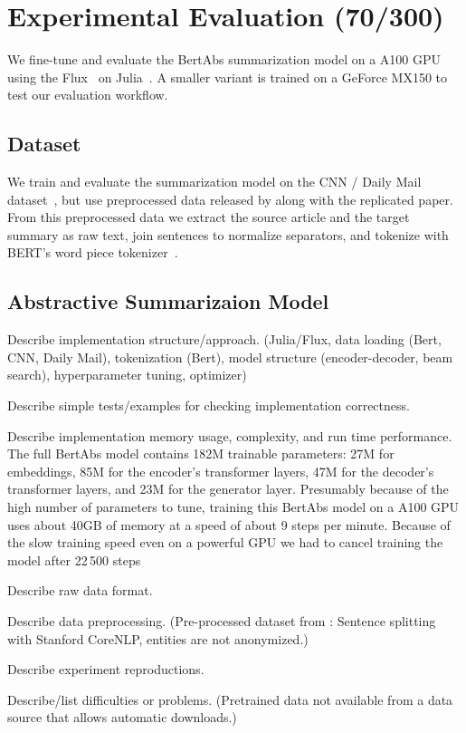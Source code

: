 \section{Experimental Evaluation (70/300)}

We fine-tune and evaluate the BertAbs summarization model on a A100 GPU using the Flux~\cite{InnesSFGRJKPS2018} on Julia~\cite{BezansonEKS2017}.
A smaller variant is trained on a GeForce MX150 to {\color{red} test our evaluation workflow}.

\subsection{Dataset}

We train and evaluate the summarization model on the CNN / Daily Mail dataset~\cite{HermannKGEKSB2015}, but use preprocessed data released by \citeauthor{LiuL2019} along with the replicated paper.
From this preprocessed data we extract the source article and the target summary as raw text, join sentences to normalize separators, and tokenize with BERT's word piece tokenizer~\cite{DevlinCLT2019}.

\subsection{Abstractive Summarizaion Model}


Describe implementation structure/approach. (Julia/Flux, data loading (Bert, CNN, Daily Mail), tokenization (Bert), model structure (encoder-decoder, beam search), hyperparameter tuning, optimizer)

Describe simple tests/examples for checking implementation correctness.

Describe implementation memory usage, complexity, and run time performance.
The full BertAbs model contains 182M trainable parameters: 27M for embeddings, 85M for the encoder's transformer layers, 47M for the decoder's transformer layers, and 23M for the generator layer.
Presumably because of the high number of parameters to tune, training this BertAbs model on a A100 GPU uses about 40GB of memory at a speed of about 9 steps per minute.
Because of the slow training speed even on a powerful GPU we had to cancel training the model after 22\,500 steps

Describe raw data format.

Describe data preprocessing. (Pre-processed dataset from \citeauthor{LiuL2019}: Sentence splitting  with Stanford CoreNLP, entities are not anonymized.)

Describe experiment reproductions.

Describe/list difficulties or problems. (Pretrained data not available from a data source that allows automatic downloads.)
